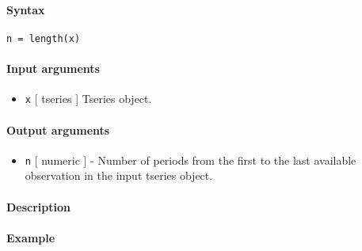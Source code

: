 


	\paragraph{Syntax}

\begin{verbatim}
n = length(x)
\end{verbatim}

\paragraph{Input arguments}

\begin{itemize}
\itemsep1pt\parskip0pt
\item
  \texttt{x} {[} tseries {]} Tseries object.
\end{itemize}

\paragraph{Output arguments}

\begin{itemize}
\itemsep1pt\parskip0pt
\item
  \texttt{n} {[} numeric {]} - Number of periods from the first to the
  last available observation in the input tseries object.
\end{itemize}

\paragraph{Description}

\paragraph{Example}


